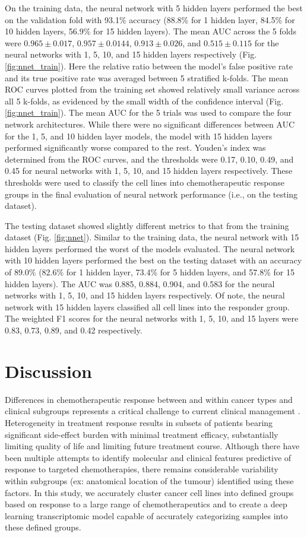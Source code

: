 \documentclass[10pt, letterpaper, twocolumn]{article}
\begin{document}
On the training data, the neural network with 5 hidden layers performed the best on the validation fold with 93.1\% accuracy (88.8\% for 1 hidden layer, 84.5\% for 10 hidden layers, 56.9\% for 15 hidden layers). The mean AUC across the 5 folds were $0.965 \pm 0.017$, $0.957 \pm 0.0144$, $0.913 \pm 0.026$, and $0.515 \pm 0.115$ for the neural networks with 1, 5, 10, and 15 hidden layers respectively (Fig. \ref{fig:nnet_train}). Here the relative ratio between the model’s false positive rate and its true positive rate was averaged between 5 stratified k-folds. The mean ROC curves plotted from the training set showed relatively small variance across all 5 k-folds, as evidenced by the small width of the confidence interval (Fig. \ref{fig:nnet_train}). The mean AUC for the 5 trials was used to compare the four network architectures. While there were no significant differences between AUC for the 1, 5, and 10 hidden layer models, the model with 15 hidden layers performed significantly worse compared to the rest. Youden's index was determined from the ROC curves, and the thresholds were 0.17, 0.10, 0.49, and 0.45 for neural networks with 1, 5, 10, and 15 hidden layers respectively. These thresholds were used to classify the cell lines into chemotherapeutic response groups in the final evaluation of neural network performance (i.e., on the testing dataset).

The testing dataset showed slightly different metrics to that from the training dataset (Fig. \ref{fig:nnet}). Similar to the training data, the neural network with 15 hidden layers performed the worst of the models evaluated. The neural network with 10 hidden layers performed the best on the testing dataset with an accuracy of 89.0\% (82.6\% for 1 hidden layer, 73.4\% for 5 hidden layers, and 57.8\% for 15 hidden layers). The AUC was 0.885, 0.884, 0.904, and 0.583 for the neural networks with 1, 5, 10, and 15 hidden layers respectively. Of note, the neural network with 15 hidden layers classified all cell lines into the responder group. The weighted F1 scores for the neural networks with 1, 5, 10, and 15 layers were 0.83, 0.73, 0.89, and 0.42 respectively.


\section{Discussion}
Differences in chemotherapeutic response between and within cancer types and clinical subgroups represents a critical challenge to current clinical management \cite{hetero, plasticity}. Heterogeneity in treatment response results in subsets of patients bearing significant side-effect burden with minimal treatment efficacy, substantially limiting quality of life and limiting future treatment course. Although there have been multiple attempts to identify molecular and clinical features predictive of response to targeted chemotherapies, there remains considerable variability within subgroups (ex: anatomical location of the tumour) identified using these factors. In this study, we accurately cluster cancer cell lines into defined groups based on response to a large range of chemotherapeutics and to create a deep learning transcriptomic model capable of accurately categorizing samples into these defined groups.
\end{document}
